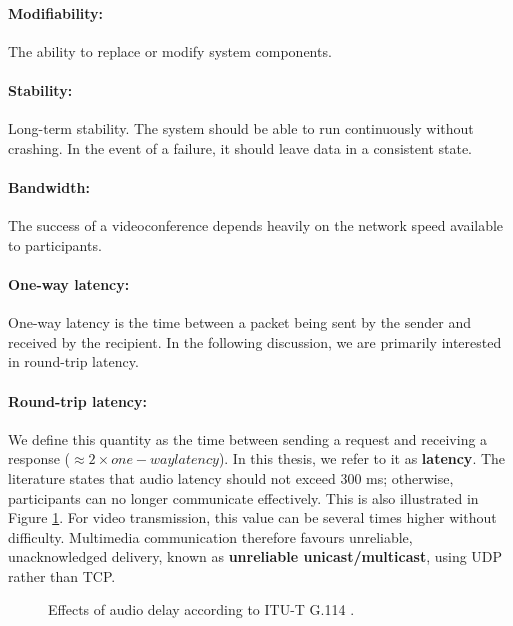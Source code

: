 \paragraph*{Modifiability:}
The ability to replace or modify system components.

\paragraph*{Stability:}
Long-term stability. The system should be able to run continuously without crashing. In the event of a failure, it should leave data in a consistent state.

\paragraph*{Bandwidth:}
The success of a videoconference depends heavily on the network speed available to participants.

\paragraph*{One-way latency:}
One-way latency is the time between a packet being sent by the sender and received by the recipient. In the following discussion, we are primarily interested in round-trip latency.

\paragraph*{Round-trip latency:}
We define this quantity as the time between sending a request and receiving a response ($\approx 2 \times one-way latency$). In this thesis, we refer to it as \textbf{latency}. The literature \cite{ITU-G.114-One-way-transmission-time} states that audio latency should not exceed 300 ms; otherwise, participants can no longer communicate effectively. This is also illustrated in Figure \ref{fig:ITU-G.114}. For video transmission, this value can be several times higher without difficulty. Multimedia communication therefore favours unreliable, unacknowledged delivery, known as \textbf{unreliable unicast/multicast}, using UDP rather than TCP.

\begin{figure}
\centering

\caption{Effects of audio delay according to ITU-T G.114 \protect\cite{ITU-G.114-One-way-transmission-time}.}
\label{fig:ITU-G.114}
\end{figure}

